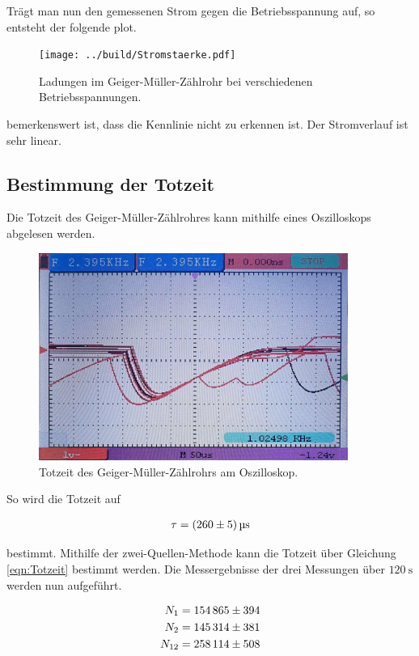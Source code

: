 \noindent Trägt man nun den gemessenen Strom gegen die Betriebsspannung auf, so entsteht der folgende plot.

\begin{figure}[H]
    \centering
    \texttt{[image: ../build/Stromstaerke.pdf]}
    \caption{Ladungen im Geiger-Müller-Zählrohr bei verschiedenen Betriebsspannungen.}
\end{figure}

\noindent bemerkenswert ist, dass die Kennlinie nicht zu erkennen ist. Der Stromverlauf ist sehr linear.



\subsection{Bestimmung der Totzeit}
\noindent Die Totzeit des Geiger-Müller-Zählrohres kann mithilfe eines Oszilloskops abgelesen werden. 

\begin{figure}[H]
    \centering
    \includegraphics[width=0.9\textwidth]{Oszilloskop.jpg}
    \caption{Totzeit des Geiger-Müller-Zählrohrs am Oszilloskop.}
\end{figure}

\noindent So wird die Totzeit auf 

\begin{align*}
    \tau = \qty{260\pm5}{\micro \second}
\end{align*}

\noindent bestimmt.
Mithilfe der zwei-Quellen-Methode kann die Totzeit über Gleichung \eqref{eqn:Totzeit} bestimmt werden. Die Messergebnisse der drei 
Messungen über $\qty{120}{\second}$ werden nun aufgeführt.

\begin{align*}
    N_{1 } &= \num{154865\pm394}    \\
    N_{2 } &= \num{145314\pm381}    \\
    N_{12} &= \num{258114\pm508}    \\
\end{align*}

